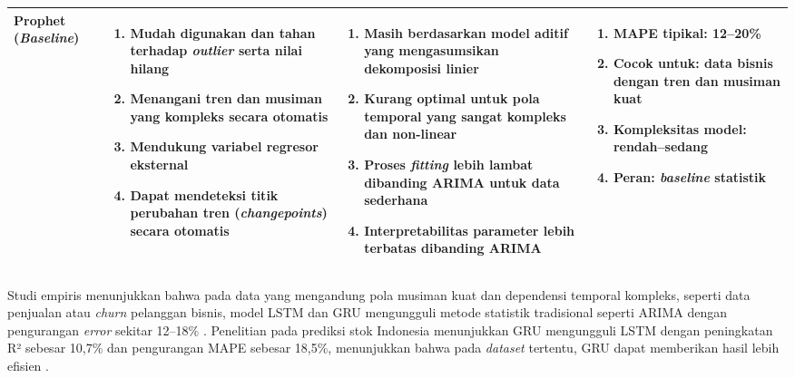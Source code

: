 \begin{longtable}{|p{1.8cm}|p{3.5cm}|p{3.8cm}|p{3cm}|}
\textbf{Prophet} (\textit{Baseline}) &
\begin{enumerate}[leftmargin=*,itemsep=0.5pt,topsep=1pt,partopsep=0pt]
  \item Mudah digunakan dan tahan terhadap \textit{outlier} serta nilai hilang
  \item Menangani tren dan musiman yang kompleks secara otomatis
  \item Mendukung variabel regresor eksternal
  \item Dapat mendeteksi titik perubahan tren (\textit{changepoints}) secara otomatis
\end{enumerate}
&
\begin{enumerate}[leftmargin=*,itemsep=0.5pt,topsep=1pt,partopsep=0pt]
  \item Masih berdasarkan model aditif yang mengasumsikan dekomposisi linier
  \item Kurang optimal untuk pola temporal yang sangat kompleks dan non-linear
  \item Proses \textit{fitting} lebih lambat dibanding ARIMA untuk data sederhana
  \item Interpretabilitas parameter lebih terbatas dibanding ARIMA
\end{enumerate}
&
\begin{enumerate}[leftmargin=*,itemsep=0.5pt,topsep=1pt,partopsep=0pt]
  \item MAPE tipikal: 12--20\%
  \item Cocok untuk: data bisnis dengan tren dan musiman kuat
  \item Kompleksitas model: rendah--sedang
  \item Peran: \textit{baseline} statistik
\end{enumerate}
\tabularnewline
\hline

\end{longtable}

Studi empiris menunjukkan bahwa pada data yang mengandung pola musiman kuat dan dependensi temporal kompleks, seperti data penjualan atau \textit{churn} pelanggan bisnis, model LSTM dan GRU mengungguli metode statistik tradisional seperti ARIMA dengan pengurangan \textit{error} sekitar 12--18\% \autocite{Sunendar2025ComparisonARIMALSTMGRU}. Penelitian pada prediksi stok Indonesia menunjukkan GRU mengungguli LSTM dengan peningkatan R² sebesar 10{,}7\% dan pengurangan MAPE sebesar 18{,}5\%, menunjukkan bahwa pada \textit{dataset} tertentu, GRU dapat memberikan hasil lebih efisien \autocite{Sabila2025LSTMGRUStockPrediction}.

